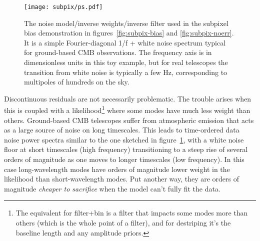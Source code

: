 \documentclass[twocolumn,apj]{aastex63}
\begin{document}
\begin{figure}
	\centering
	\texttt{[image: subpix/ps.pdf]}
	\caption{
		The noise model/inverse weights/inverse filter used in the subpixel
		bias demonstration in figures~\ref{fig:subpix-bias} and \ref{fig:subpix-noerr}.
		It is a simple Fourier-diagonal 1/f + white noise spectrum
		typical for ground-based CMB observations. The frequency axis is in
		dimensionless units in this toy example, but for real telescopes the
		transition from white noise is typically a few Hz, corresponding
		to multipoles of hundreds on the sky.
	}
	\label{fig:ps}
\end{figure}

Discontinuous residuals are not necessarily problematic. The trouble arises
when this is coupled with a likelihood\footnote{The equivalent for filter+bin is a filter that
impacts some modes more than others (which is the whole point of a filter),
and for destriping it's the baseline length and any amplitude priors.
} where some modes have much less weight than others. Ground-based CMB
telescopes suffer from atmospheric emission that acts as a large source
of noise on long timescales. This leads to time-ordered data noise power
spectra similar to the one sketched in figure~\ref{fig:ps}, with
a white noise floor at short timescales (high frequency) transitioning to a steep
rise of several orders of magnitude as one moves to longer timescales
(low frequency). In this case long-wavelength modes have orders of magnitude
lower weight in the likelihood than short-wavelength modes. Put another way,
they are orders of magnitude \emph{cheaper to sacrifice} when the model can't fully
fit the data.
\end{document}
